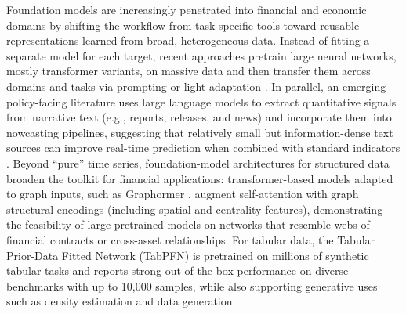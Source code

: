 Foundation models are increasingly penetrated into financial and economic domains by shifting the workflow from task-specific tools toward reusable representations learned from broad, heterogeneous data. Instead of fitting a separate model for each target, recent approaches pretrain large neural networks, mostly transformer variants, on massive data and then transfer them across domains and tasks via prompting or light adaptation \citep{AnsariEtAl2024Chronos,RasulEtAl2023LagLlama,DasEtAl2024TimesFM}. In parallel, an emerging policy-facing literature uses large language models to extract quantitative signals from narrative text (e.g., reports, releases, and news) and incorporate them into nowcasting pipelines, suggesting that relatively small but information-dense text sources can improve real-time prediction when combined with standard indicators \citep{deBondtSun2025ChatGPTNowcast,KwonEtAl2024BISLLMprimer,CarrieroEtAl2024MacroLLM}. Beyond ``pure'' time series, foundation-model architectures for structured data broaden the toolkit for financial applications: transformer-based models adapted to graph inputs, such as Graphormer \citep{Ying2021Graphormer}, augment self-attention with graph structural encodings (including spatial and centrality features), demonstrating the feasibility of large pretrained models on networks that resemble webs of financial contracts or cross-asset relationships. For tabular data, the Tabular Prior-Data Fitted Network (TabPFN) \citep{HollmannEtAl2025TabPFN} is pretrained on millions of synthetic tabular tasks and reports strong out-of-the-box performance on diverse benchmarks with up to 10,000 samples, while also supporting generative uses such as density estimation and data generation. %


